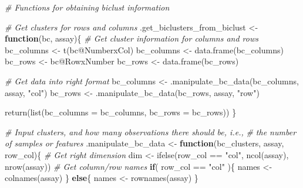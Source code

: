 \documentclass[
]{book}
\newenvironment{Shaded}{\begin{snugshade}}{\end{snugshade}}
\newcommand{\AttributeTok}[1]{\textcolor[rgb]{0.77,0.63,0.00}{#1}}
\newcommand{\CommentTok}[1]{\textcolor[rgb]{0.56,0.35,0.01}{\textit{#1}}}
\newcommand{\ControlFlowTok}[1]{\textcolor[rgb]{0.13,0.29,0.53}{\textbf{#1}}}
\newcommand{\FunctionTok}[1]{\textcolor[rgb]{0.00,0.00,0.00}{#1}}
\newcommand{\NormalTok}[1]{#1}
\newcommand{\OtherTok}[1]{\textcolor[rgb]{0.56,0.35,0.01}{#1}}
\newcommand{\SpecialCharTok}[1]{\textcolor[rgb]{0.00,0.00,0.00}{#1}}
\newcommand{\StringTok}[1]{\textcolor[rgb]{0.31,0.60,0.02}{#1}}
\begin{document}
\begin{Shaded}
\begin{Highlighting}[]
\CommentTok{\# Functions for obtaining biclust information}

\CommentTok{\# Get clusters for rows and columns}
\NormalTok{.get\_biclusters\_from\_biclust }\OtherTok{\textless{}{-}} \ControlFlowTok{function}\NormalTok{(bc, assay)\{}
  \CommentTok{\# Get cluster information for columns and rows}
\NormalTok{  bc\_columns }\OtherTok{\textless{}{-}} \FunctionTok{t}\NormalTok{(bc}\SpecialCharTok{@}\NormalTok{NumberxCol)}
\NormalTok{  bc\_columns }\OtherTok{\textless{}{-}} \FunctionTok{data.frame}\NormalTok{(bc\_columns)}
\NormalTok{  bc\_rows }\OtherTok{\textless{}{-}}\NormalTok{ bc}\SpecialCharTok{@}\NormalTok{RowxNumber}
\NormalTok{  bc\_rows }\OtherTok{\textless{}{-}} \FunctionTok{data.frame}\NormalTok{(bc\_rows)}
  
  \CommentTok{\# Get data into right format}
\NormalTok{  bc\_columns }\OtherTok{\textless{}{-}} \FunctionTok{.manipulate\_bc\_data}\NormalTok{(bc\_columns, assay, }\StringTok{"col"}\NormalTok{)}
\NormalTok{  bc\_rows }\OtherTok{\textless{}{-}} \FunctionTok{.manipulate\_bc\_data}\NormalTok{(bc\_rows, assay, }\StringTok{"row"}\NormalTok{)}
  
  \FunctionTok{return}\NormalTok{(}\FunctionTok{list}\NormalTok{(}\AttributeTok{bc\_columns =}\NormalTok{ bc\_columns, }\AttributeTok{bc\_rows =}\NormalTok{ bc\_rows))}
\NormalTok{\}}

\CommentTok{\# Input clusters, and how many observations there should be, i.e.,}
\CommentTok{\# the number of samples or features}
\NormalTok{.manipulate\_bc\_data }\OtherTok{\textless{}{-}} \ControlFlowTok{function}\NormalTok{(bc\_clusters, assay, row\_col)\{}
  \CommentTok{\# Get right dimension}
\NormalTok{  dim }\OtherTok{\textless{}{-}} \FunctionTok{ifelse}\NormalTok{(row\_col }\SpecialCharTok{==} \StringTok{"col"}\NormalTok{, }\FunctionTok{ncol}\NormalTok{(assay), }\FunctionTok{nrow}\NormalTok{(assay))}
  \CommentTok{\# Get column/row names}
  \ControlFlowTok{if}\NormalTok{( row\_col }\SpecialCharTok{==} \StringTok{"col"}\NormalTok{ )\{}
\NormalTok{    names }\OtherTok{\textless{}{-}} \FunctionTok{colnames}\NormalTok{(assay)}
\NormalTok{  \} }\ControlFlowTok{else}\NormalTok{\{}
\NormalTok{    names }\OtherTok{\textless{}{-}} \FunctionTok{rownames}\NormalTok{(assay)}
\NormalTok{  \}}
  

\end{Highlighting}
\end{Shaded}
\end{document}
